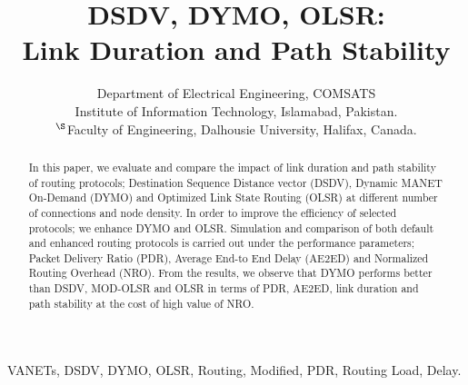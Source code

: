 \documentclass[journal]{IEEEtran}
\begin{document}
\title{DSDV, DYMO, OLSR:\\ Link Duration and Path Stability}


\author{
                Department of Electrical Engineering, COMSATS\\ Institute of
                Information Technology, Islamabad, Pakistan. \\
                $^{\S}$Faculty of Engineering, Dalhousie University, Halifax, Canada.
             }



\maketitle

\begin{abstract}
In this paper, we evaluate and compare the impact of link duration and path stability of routing protocols; Destination Sequence Distance vector (DSDV), Dynamic MANET On-Demand (DYMO) and Optimized Link State Routing (OLSR) at different number of connections and node density. In order to improve the efficiency of selected protocols; we enhance DYMO and OLSR. Simulation and comparison of both default and enhanced routing protocols is carried out under the performance parameters; Packet Delivery Ratio (PDR), Average End-to End Delay (AE2ED) and Normalized Routing Overhead (NRO). From the results, we observe that DYMO performs better than DSDV, MOD-OLSR and OLSR in terms of PDR, AE2ED, link duration and path stability at the cost of high value of NRO.
\end{abstract}

\begin{IEEEkeywords}
VANETs, DSDV, DYMO, OLSR, Routing, Modified, PDR, Routing Load, Delay.
\end{IEEEkeywords}

\IEEEpeerreviewmaketitle
\end{document}
